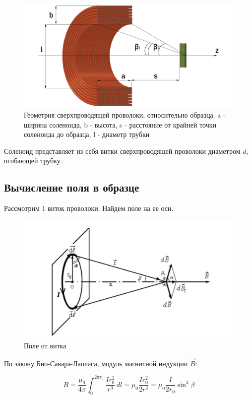 \documentclass[10pt]{article}
\begin{document}
\begin{figure}[h!]
	\centering
	\includegraphics[scale = 0.2]{magn_scheme.png}
	\caption{Геометрия сверхпроводящей проволоки, относительно образца. a - ширина соленоида, b - высота, s - расстояние от крайней точки соленоида до образца, l - диаметр трубки}
	\label{fig:mag_scheme}
\end{figure}

Соленоид представляет из себя витки сверхпроводящей проволоки диаметром $d$, огибающей трубку. 

\subsection{Вычисление поля в образце}

Рассмотрим 1 виток проволоки. Найдем поле на ее оси.

\begin{figure}[h!]
	\centering
	\includegraphics[scale = 0.1]{coil}
	\caption{Поле от витка}
	\label{fig:coil}
\end{figure}

По закону Био-Савара-Лапласа, модуль магнитной индукции $\vec{B}$:

\begin{equation}\label{eq:BSR}
B = \frac{\mu_0}{4 \pi}  \int_{0}^{2 \pi r_0}  \frac{I r_0^2}{r^3}\,dl  = \mu_0 \frac{I r_0^2}{2 r^3} = \mu_0 \frac{I}{2 r_0} \sin^3{\beta}
\end{equation}
\end{document}

